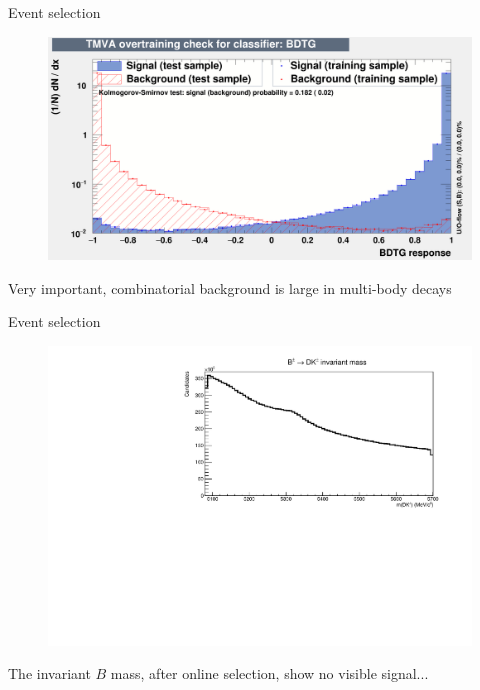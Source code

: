 \documentclass{beamer}
\begin{document}
\begin{frame}{Event selection}
  \begin{figure}
    \centering
    \includegraphics[width = 1.0\textwidth]{Plots/overtrain_BDTG_log.png}
  \end{figure}
  \begin{center}
    Very important, combinatorial background is large in multi-body decays
  \end{center}
\end{frame}

\begin{frame}{Event selection}
  \begin{figure}
    \centering
    \includegraphics[width = 1.0\textwidth]{Plots/BmassStripping.pdf}
  \end{figure}
  \begin{center}
    The invariant $B$ mass, after online selection, show no visible signal...
  \end{center}
\end{frame}
\end{document}
